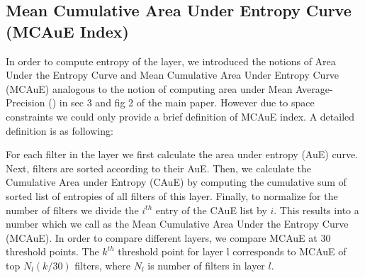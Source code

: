 \documentclass[runningheads]{llncs}
\begin{document}
\subsection{Mean Cumulative Area Under Entropy Curve (MCAuE Index)}
In order to compute entropy of the layer, we introduced the notions of Area Under the Entropy Curve and Mean Cumulative Area Under Entropy Curve (MCAuE) analogous to the notion of computing area under Mean Average-Precision (\cite{Pascal}) in sec 3 and fig 2 of the main paper. However due to space constraints we could only provide a brief definition of MCAuE index. A detailed definition is as following:

For each filter in the layer we first calculate the area under entropy (AuE) curve. Next, filters are sorted according to their AuE. Then, we calculate the Cumulative Area under Entropy (CAuE) by computing the cumulative sum of sorted list of entropies of all filters of this layer. Finally, to normalize for the number of filters we divide the $i^{th}$ entry of the CAuE list by $i$. This results into a number which we call as the Mean Cumulative Area Under the Entropy Curve (MCAuE). In order to compare different layers, we compare MCAuE at 30 threshold points. The  $k^{th}$ threshold point for layer l corresponds to MCAuE of top $N_l(k/30)$ filters, where $N_l$ is number of filters in layer $l$.
\end{document}
